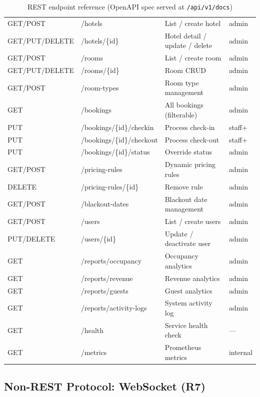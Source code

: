 \documentclass[12pt,a4paper]{article}
\begin{document}
\begin{table}[H]
\begin{tabularx}{\linewidth}{@{} l l X l @{}}
GET/POST       & /hotels             & List / create hotel          & admin \\
GET/PUT/DELETE & /hotels/\{id\}      & Hotel detail / update / delete & admin \\
GET/POST       & /rooms              & List / create room           & admin \\
GET/PUT/DELETE & /rooms/\{id\}       & Room CRUD                    & admin \\
GET/POST       & /room-types         & Room type management         & admin \\
GET            & /bookings           & All bookings (filterable)    & admin \\
PUT            & /bookings/\{id\}/checkin  & Process check-in       & staff+ \\
PUT            & /bookings/\{id\}/checkout & Process check-out      & staff+ \\
PUT            & /bookings/\{id\}/status   & Override status        & admin \\
GET/POST       & /pricing-rules      & Dynamic pricing rules        & admin \\
DELETE         & /pricing-rules/\{id\}     & Remove rule            & admin \\
GET/POST       & /blackout-dates     & Blackout date management     & admin \\
GET/POST       & /users              & List / create users          & admin \\
PUT/DELETE     & /users/\{id\}       & Update / deactivate user     & admin \\
GET            & /reports/occupancy  & Occupancy analytics          & admin \\
GET            & /reports/revenue    & Revenue analytics            & admin \\
GET            & /reports/guests     & Guest analytics              & admin \\
GET            & /reports/activity-logs & System activity log      & admin \\
\midrule
GET & /health  & Service health check   & --- \\
GET & /metrics & Prometheus metrics     & internal \\
\bottomrule
\end{tabularx}
\caption{REST endpoint reference (OpenAPI spec served at \texttt{/api/v1/docs})}
\end{table}

\subsection{Non-REST Protocol: WebSocket (R7)}
\end{document}
